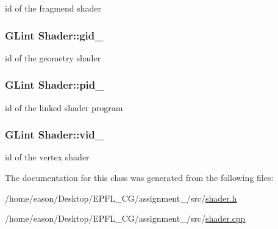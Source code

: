 id of the fragmend shader 

\subsubsection[{\texorpdfstring{gid\+\_\+}{gid_}}]{\setlength{\rightskip}{0pt plus 5cm}G\+Lint Shader\+::gid\+\_\+\hspace{0.3cm}{\ttfamily [private]}}\hypertarget{classShader_ab2ee206d6a62bc218e1f6f1c0a424cdf}{}\label{classShader_ab2ee206d6a62bc218e1f6f1c0a424cdf}


id of the geometry shader 

\subsubsection[{\texorpdfstring{pid\+\_\+}{pid_}}]{\setlength{\rightskip}{0pt plus 5cm}G\+Lint Shader\+::pid\+\_\+\hspace{0.3cm}{\ttfamily [private]}}\hypertarget{classShader_a60ee8c3fab7e88c16e10ab1c9645b3bf}{}\label{classShader_a60ee8c3fab7e88c16e10ab1c9645b3bf}


id of the linked shader program 

\subsubsection[{\texorpdfstring{vid\+\_\+}{vid_}}]{\setlength{\rightskip}{0pt plus 5cm}G\+Lint Shader\+::vid\+\_\+\hspace{0.3cm}{\ttfamily [private]}}\hypertarget{classShader_a82849da0db25a51821c30c344ef15b19}{}\label{classShader_a82849da0db25a51821c30c344ef15b19}


id of the vertex shader 



The documentation for this class was generated from the following files\+:\begin{DoxyCompactItemize}
\item 
/home/eason/\+Desktop/\+E\+P\+F\+L\+\_\+\+C\+G/assignment\+\_/src/\hyperlink{shader_8h}{shader.\+h}\item 
/home/eason/\+Desktop/\+E\+P\+F\+L\+\_\+\+C\+G/assignment\+\_/src/\hyperlink{shader_8cpp}{shader.\+cpp}\end{DoxyCompactItemize}
